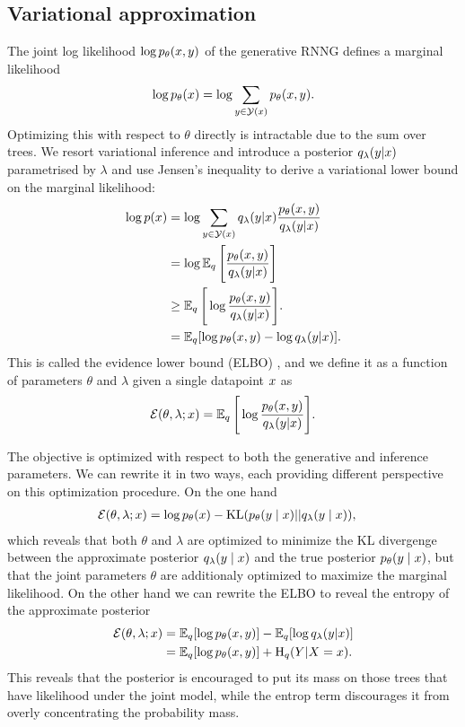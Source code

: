   \subsection{Variational approximation}
    The joint log likelihood $\log p_{\theta}(x, y)$ of the generative RNNG defines a marginal likelihood
    \begin{align*}
      \log p_{\theta}(x) = \log \sum_{y \in \mathcal{Y}(x)} p_{\theta}(x, y).
    \end{align*}
    Optimizing this with respect to $\theta$ directly is intractable due to the sum over trees. We resort variational inference \citep{jordan1999vi,blei2016vi} and introduce a posterior $q_{\lambda}(y | x)$ parametrised by $\lambda$ and use Jensen's inequality to derive a variational lower bound on the marginal likelihood:
    \begin{align}
      \label{eq:lowerbound}
      \log p (x)
        &= \log \sum_{y  \in \mathcal{Y}(x)} q_{\lambda}(y |x) \frac{p_{\theta}(x,y )}{q_{\lambda}(y | x)} \nonumber  \\
        &= \log \operatorname{\mathbb{E}}_q \Bigg[ \frac{p_{\theta}(x,y )}{ q_{\lambda}(y | x)} \Bigg] \nonumber  \\
        &\geq \operatorname{\mathbb{E}}_q \Bigg[ \log \frac{p_{\theta}(x,y )}{q_{\lambda}(y | x)} \Bigg].  \nonumber \\
        &= \operatorname{\mathbb{E}}_q [\log p_{\theta}(x,y )  - \log q_{\lambda}(y | x) ].
    \end{align}
    This is called the evidence lower bound (ELBO) \citep{blei2016vi}, and we define it as a function of parameters $\theta$ and $\lambda$ given a single datapoint $x$ as
    \begin{align}
      \operatorname{\mathcal{E}}(\theta, \lambda; x) = \operatorname{\mathbb{E}}_q \Bigg[ \log \frac{p_{\theta}(x,y )}{q_{\lambda}(y | x)} \Bigg].
    \end{align}

    The objective is optimized with respect to both the generative and inference parameters. We can rewrite it in two ways, each providing different perspective on this optimization procedure. On the one hand
    \begin{align*}
      \operatorname{\mathcal{E}}(\theta, \lambda; x) &= \log p_{\theta}(x) - \operatorname{KL}(p_{\theta}(y \mid x) \rvert\lvert q_{\lambda}(y \mid x)),
    \end{align*}
    which reveals that both $\theta$ and $\lambda$ are optimized to minimize the KL divergenge between the approximate posterior $q_{\lambda}(y \mid x)$ and the true posterior $p_{\theta}(y \mid x)$, but that the joint parameters $\theta$ are additionaly optimized to maximize the marginal likelihood. On the other hand we can rewrite the ELBO to reveal the entropy of the approximate posterior
    \begin{align}
      \operatorname{\mathcal{E}}(\theta, \lambda; x)
        &= \operatorname{\mathbb{E}}_q [ \log p_{\theta}( x, y ) ] - \operatorname{\mathbb{E}}_q [ \log q_{\lambda}(y | x) ]  \nonumber \\
        &= \operatorname{\mathbb{E}}_q [ \log p_{\theta}( x, y ) ] + \operatorname{H}_q(Y | X = x).
    \end{align}
    This reveals that the posterior is encouraged to put its mass on those trees that have likelihood under the joint model, while the entrop term discourages it from overly concentrating the probability mass.

